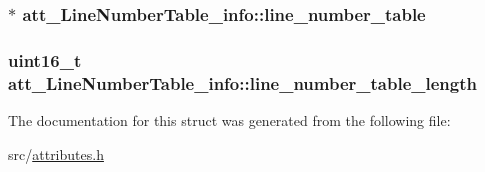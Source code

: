 \subsubsection[{\texorpdfstring{line\+\_\+number\+\_\+table}{line_number_table}}]{$\ast$ att\+\_\+\+Line\+Number\+Table\+\_\+info\+::line\+\_\+number\+\_\+table}\hypertarget{structatt__LineNumberTable__info_ac9c52cc4b931ea8cfc746ea0a1d573ac}{}\label{structatt__LineNumberTable__info_ac9c52cc4b931ea8cfc746ea0a1d573ac}
\subsubsection[{\texorpdfstring{line\+\_\+number\+\_\+table\+\_\+length}{line_number_table_length}}]{\setlength{\rightskip}{0pt plus 5cm}uint16\+\_\+t att\+\_\+\+Line\+Number\+Table\+\_\+info\+::line\+\_\+number\+\_\+table\+\_\+length}\hypertarget{structatt__LineNumberTable__info_a6c335e2b6b14577d9a0e063cd5a361e0}{}\label{structatt__LineNumberTable__info_a6c335e2b6b14577d9a0e063cd5a361e0}


The documentation for this struct was generated from the following file\+:\begin{DoxyCompactItemize}
\item 
src/\hyperlink{attributes_8h}{attributes.\+h}\end{DoxyCompactItemize}
